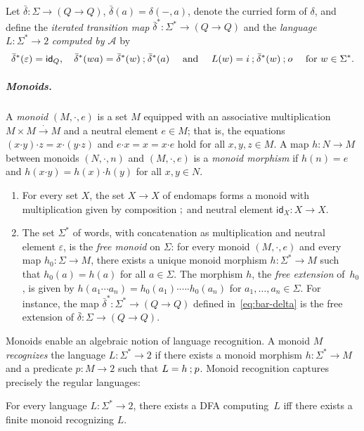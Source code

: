 \documentclass[a4paper, UKenglish, numberwithinsect, thm-restate, cleveref, final]{lipics-v2021}
\newcommand{\resetCurThmBraces}{\gdef\curThmBraceOpen{(}\gdef\curThmBraceClose{)}}
\newcommand{\removeThmBraces}{\gdef\curThmBraceOpen{}\gdef\curThmBraceClose{}}
\newenvironment{notheorembrackets}{\removeThmBraces}{\resetCurThmBraces}
\theoremstyle{plain}
\theoremstyle{definition}
\newcommand{\nil}{\ensuremath{\varepsilon}}
\newcommand{\seq}{\ensuremath{\mathbin{\text{\upshape;}}}}
\newcommand{\id}{\ensuremath{\mathsf{id}}}
\newcommand{\xto}{\xrightarrow}
\newcommand{\mult}{\mathbin{\boldsymbol{\cdot}}}
\newcommand{\A}{\ensuremath{\mathcal{A}}\xspace}
\numberwithin{equation}{section}
\begin{document}
Let $\bar\delta\colon \Sigma\to (Q\to Q)$, $\bar\delta(a) = \delta(-, a)$, denote the curried  form of $\delta$, and define the \emph{iterated transition map} $\bar\delta^* \colon \Sigma^{*} \rightarrow (Q \rightarrow Q)$ and the \emph{language} $L \colon \Sigma^{*} \rightarrow 2$ \emph{computed by \A} by
\begin{equation}
  \bar \delta^{*}(\varepsilon) = \id_{Q}, \quad \bar \delta^{*}(wa) = \bar \delta^{*}(w) \seq \bar \delta^{*}(a) \quad \text{ and } \quad L(w) = i \seq \bar \delta^{*}(w) \seq o \quad \text{ for } w \in \Sigma^{*}.\label{eq:bar-delta}
\end{equation}
\subparagraph{Monoids.} A \emph{monoid} $(M,\mult ,e)$ is a set $M$ equipped with an
associative multiplication $ M\times M\xto{\mult } M$ and a neutral
element $e\in M$; that is, the equations
$(x\mult y) \mult z = x\mult(y\mult z)$ and $e\mult x=x=x\mult e$
hold for all $x,y,z\in M$.
A map \(h \colon N \rightarrow M\) between monoids \((N, \mult, n)\) and \((M, \mult, e)\) is a \emph{monoid morphism} if $h(n)=e$ and $h(x\mult y)=h(x)\mult h(y)$ for all $x,y\in N$.
\begin{expl}\label{ex:monoids}
\begin{enumerate}[(1)]
\item For every set $X$, the set $X\to X$ of endomaps forms a monoid with multiplication given by composition $\seq$ and neutral element $\id_X\colon X\to X$.
  \item The set $\Sigma^*$ of words, with concatenation as multiplication  and neutral element $\nil$, is the \emph{free monoid}
  on $\Sigma$: for every monoid $(M,\mult,e)$ and every map $h_0\colon \Sigma\to M$, there
  exists a unique monoid morphism $h\colon \Sigma^*\to M$ such that $h_0(a)=h(a)$ for all
  $a\in \Sigma$. The morphism $h$, the \emph{free extension} of~$h_0$, is given by
  $h(a_1\cdots a_n)=h_0(a_1)\mult\cdots\mult h_0(a_n)$ for $a_1,\ldots,a_n\in \Sigma$.  For
  instance, the map $\bar \delta^*\colon \Sigma^*\to (Q\to Q)$ defined in~\eqref{eq:bar-delta}
  is the free extension of $\bar \delta\colon \Sigma\to (Q\to Q)$.
\end{enumerate}
\end{expl}
Monoids enable an algebraic notion of language recognition. A monoid $M$ \emph{recognizes} the language $L\colon \Sigma^*\to 2$ if there exists a monoid morphism $h\colon \Sigma^*\to M$ and a predicate $p\colon M\to 2$ such that $L = h \seq p$.
Monoid recognition captures precisely the regular languages:
\begin{notheorembrackets}
\begin{theorem}[{\cite[Thm.\ 1]{rs59}}]
  For every language $L\colon \Sigma^*\to 2$, there exists a DFA computing~$L$ iff there exists a finite monoid recognizing $L$.
\end{theorem}
\end{notheorembrackets}
\end{document}
